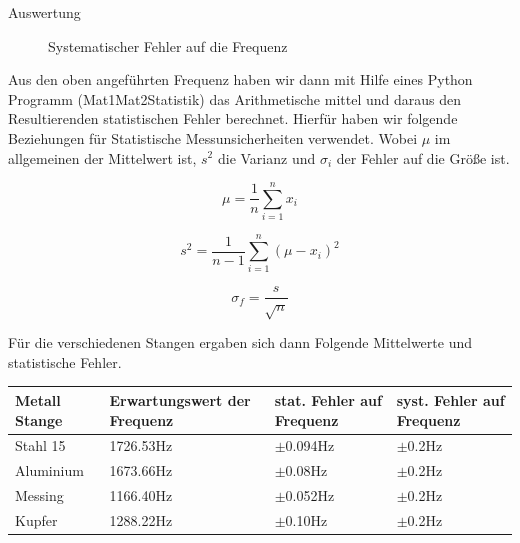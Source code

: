 \documentclass[twoside]{protokoll}
\begin{document}
\begin{aufgabe}{Auswertung}
\begin{figure}[H]
  \centering
    \caption{Systematischer Fehler auf die Frequenz}
  \hfill
\end{figure}
\begin{figure}[H]
  \centering
  \hfill
\end{figure}
 
Aus den oben angeführten Frequenz haben wir dann mit Hilfe eines Python Programm (Mat1Mat2Statistik) das Arithmetische mittel und daraus den Resultierenden statistischen Fehler berechnet. Hierfür haben wir folgende Beziehungen für Statistische Messunsicherheiten verwendet. Wobei $\mu$ im allgemeinen der Mittelwert ist, $s^2$ die Varianz und $\sigma_i$ der Fehler auf die Größe ist.

\begin{equation}
	\mu = \frac{1}{n}\sum_{i=1}^nx_i
\end{equation}

\begin{equation}
	s^2 = \frac{1}{n-1}\sum_{i=1}^n(\mu-x_i)^2
\end{equation}

\begin{equation}
	\sigma_f = \frac{s}{\sqrt{n}} 
\end{equation}

Für die verschiedenen Stangen ergaben sich dann Folgende Mittelwerte und statistische Fehler.\\


 \begin{table}[H]
        \centering
        \begin{tabularx}{1\textwidth}{X X X X} %
            \toprule
            \textbf{Metall Stange} & \textbf{Erwartungswert der Frequenz} & \textbf{stat. Fehler auf Frequenz} & \textbf{syst. Fehler auf Frequenz} \\
            \midrule
            Stahl 15 & 1726.53Hz & $\pm$0.094Hz & $\pm$0.2Hz\\
            Aluminium & 1673.66Hz & $\pm$0.08Hz & $\pm$0.2Hz \\
            Messing & 1166.40Hz & $\pm$0.052Hz & $\pm$0.2Hz \\
            Kupfer & 1288.22Hz & $\pm$0.10Hz & $\pm$0.2Hz \\


\end{tabularx}
\end{table}
\end{aufgabe}
\end{document}
